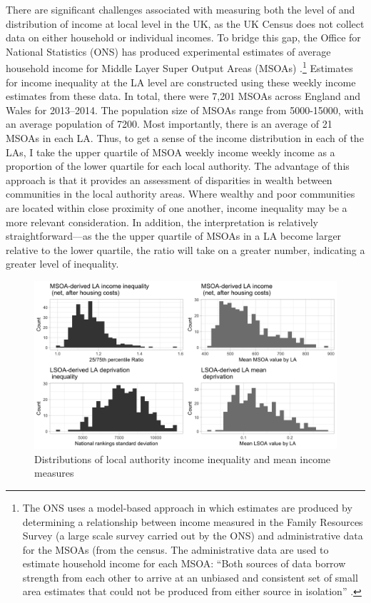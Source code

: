 \documentclass[12pt, letter]{scrartcl}
\begin{document}
There are significant challenges associated with measuring both the level of and distribution of income at local level in the UK, as the UK Census does not collect data on either household or individual incomes. To bridge this gap, the Office for National Statistics (ONS) has produced experimental estimates of average household income for Middle Layer Super Output Areas (MSOAs) \parencite{bond2010understanding}.\footnote{The ONS uses a model-based approach in which estimates are produced by determining a relationship between income measured in the Family Resources Survey (a large scale survey carried out by the ONS) and administrative data for the MSOAs (from the census. The administrative data are used to estimate household income for each MSOA: ``Both sources of data borrow strength from each other to arrive at an unbiased and consistent set of small area estimates that could not be produced from either source in isolation'' \parencite[81]{bond2010understanding}.} Estimates for income inequality at the LA level are constructed using these weekly income estimates from these data. In total, there were 7,201 MSOAs across England and Wales for 2013--2014. The population size of MSOAs range from 5000-15000, with an average population of 7200. Most importantly, there is an average of 21 MSOAs in each LA. Thus, to get a sense of the income distribution in each of the LAs, I take the upper quartile of MSOA weekly income weekly income as a proportion of the lower quartile for each local authority. The advantage of this approach is that it provides an assessment of disparities in wealth between communities in the local authority areas. Where wealthy and poor communities are located within close proximity of one another, income inequality may be a more relevant consideration. In addition, the interpretation is relatively straightforward---as the the upper quartile of MSOAs in a LA become larger relative to the lower quartile, the ratio will take on a greater number, indicating a greater level of inequality.

\begin{figure}[t]
\centering
\vspace{10pt}
\includegraphics[scale=0.15]{poli680_lainequality.png}
\caption{Distributions of local authority income inequality and mean income measures}
\label{fig:distributions}
\end{figure}
\end{document}
